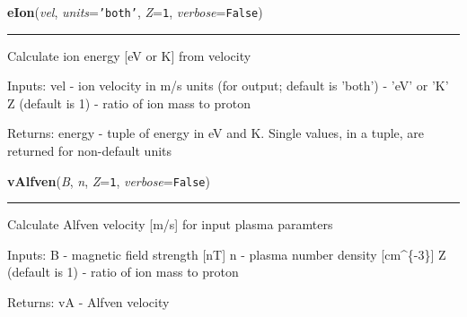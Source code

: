     \label{spacepy:constants:eIon}

    \vspace{0.5ex}

\hspace{.8\funcindent}\begin{boxedminipage}{\funcwidth}

    \raggedright \textbf{eIon}(\textit{vel}, \textit{units}={\tt \texttt{'}\texttt{both}\texttt{'}}, \textit{Z}={\tt 1}, \textit{verbose}={\tt False})

    \vspace{-1.5ex}

    \rule{\textwidth}{0.5\fboxrule}
\setlength{\parskip}{2ex}
    Calculate ion energy [eV or K] from velocity

    Inputs: vel - ion velocity in m/s units (for output; default is 'both')
    - 'eV' or 'K' Z (default is 1) - ratio of ion mass to proton

    Returns: energy - tuple of energy in eV and K. Single values, in a 
    tuple, are returned for non-default units

\setlength{\parskip}{1ex}
    \end{boxedminipage}

    \label{spacepy:constants:vAlfven}

    \vspace{0.5ex}

\hspace{.8\funcindent}\begin{boxedminipage}{\funcwidth}

    \raggedright \textbf{vAlfven}(\textit{B}, \textit{n}, \textit{Z}={\tt 1}, \textit{verbose}={\tt False})

    \vspace{-1.5ex}

    \rule{\textwidth}{0.5\fboxrule}
\setlength{\parskip}{2ex}
    Calculate Alfven velocity [m/s] for input plasma paramters

    Inputs: B - magnetic field strength [nT] n - plasma number density 
    [cm{\textasciicircum}\{-3\}] Z (default is 1) - ratio of ion mass to 
    proton

    Returns: vA - Alfven velocity

\setlength{\parskip}{1ex}
    \end{boxedminipage}


